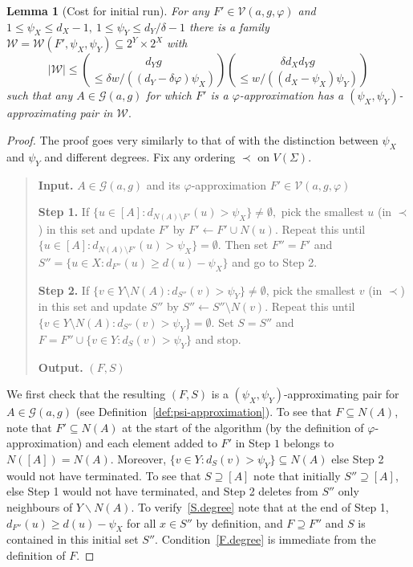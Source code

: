 \documentclass[a4paper]{amsart}
\newtheorem{lem}[thm]{Lemma}
\theoremstyle{definition}
\newcommand{\cG}{\mathcal{G} }
\newcommand{\cV}{\mathcal{V} }
\newcommand{\cW}{\mathcal{W} }
\newcommand{\beq}[1]{\begin{equation}\label{#1}}
\newcommand{\enq}[0]{\end{equation}}
\newcommand{\nin}[0]{\noindent}
\newcommand{\sub}[0]{\subseteq}
\newcommand{\0}[0]{\emptyset}
\begin{document}
\begin{lem}[Cost for initial run]\label{lem.psi} For any $F' \in \cV(a,g,\varphi)$ and $1 \le \psi_X \leq d_X-1, \ 1\leq \psi_Y \le d_Y/\delta-1$ there is a family $\cW=\cW(F', \psi_X, \psi_Y) \sub 2^Y \times 2^X$ with
\beq{psi_bd}|\cW|\le {d_Yg \choose \le \delta w/((d_Y-\delta \varphi)\psi_X)}{\delta d_X d_Y g \choose \le w/((d_X-\psi_X)\psi_Y)}\enq
such that any $A \in \cG(a,g)$ for which $F'$ is a $\varphi$-approximation has a $(\psi_X, \psi_Y)$-approximating pair in $\cW.$
\end{lem}

\begin{proof}
    The proof goes very similarly to that of \cite[Lemma 5.5]{Galvin_independent} with the distinction between $\psi_X$ and $\psi_Y$ and different degrees. Fix any ordering $\prec$ on $V(\Sigma).$

\begin{quote}
    \nin \textbf{Input.} $A \in \cG(a,g)$ and its $\varphi$-approximation $F' \in \cV(a,g,\varphi)$

    \nin \textbf{Step 1.}  If $\{u \in [A]:d_{N(A)\setminus F'}(u)>\psi_X\} \ne \emptyset,$ pick the smallest $u$ (in $\prec$) in this set and update $F'$ by $F' \leftarrow F' \cup N(u).$ Repeat this until $\{u \in [A]:d_{N(A) \setminus F'}(u)>\psi_X\}=\emptyset.$ Then set $F''=F'$ and $S''=\{u \in X:d_{F''}(u) \ge d(u)-\psi_X\}$ and go to Step 2.

    \nin \textbf{Step 2.} If $\{v \in Y \setminus N(A): d_{S''}(v)>\psi_Y\} \ne \emptyset$, pick the smallest $v$ (in $\prec$) in this set and update $S''$ by $S'' \leftarrow S'' \setminus N(v).$ Repeat this until $\{v \in Y \setminus N(A):d_{S''}(v)>\psi_Y\}=\emptyset.$ Set $S=S''$ and $F=F'' \cup \{v \in Y:d_{S}(v)>\psi_Y\}$ and stop.

    \nin \textbf{Output.} $(F, S)$
\end{quote}

    We first check that the resulting $(F, S)$ is a $(\psi_X, \psi_Y)$-approximating pair for $A \in \cG(a,g)$ (see Definition~\ref{def:psi-approximation}). To see that $F\subseteq  N(A)$, note that $F'\subseteq N(A)$ at the start of the algorithm (by the definition of $\varphi$-approximation) and each element added to $F'$ in Step $1$ belongs to $N([A])=N(A)$. Moreover, $\{v \in Y: d_S(v)>\psi_Y\}\subseteq N(A)$ else Step 2 would not have terminated. To see that $S\supseteq [A]$ note that initially  $S''\supseteq [A]$, else Step 1 would not have terminated, and Step 2 deletes from $S''$ only neighbours of $Y\backslash N(A)$. To verify~\eqref{S.degree} note that at the end of Step 1, $d_{F''}(u)\geq d(u)-\psi_X$ for all $x\in S''$ by definition, and $F\supseteq F''$ and $S$ is contained in this initial set $S''$. Condition~\eqref{F.degree} is immediate from the definition of $F$.
    

\end{proof}
\end{document}
